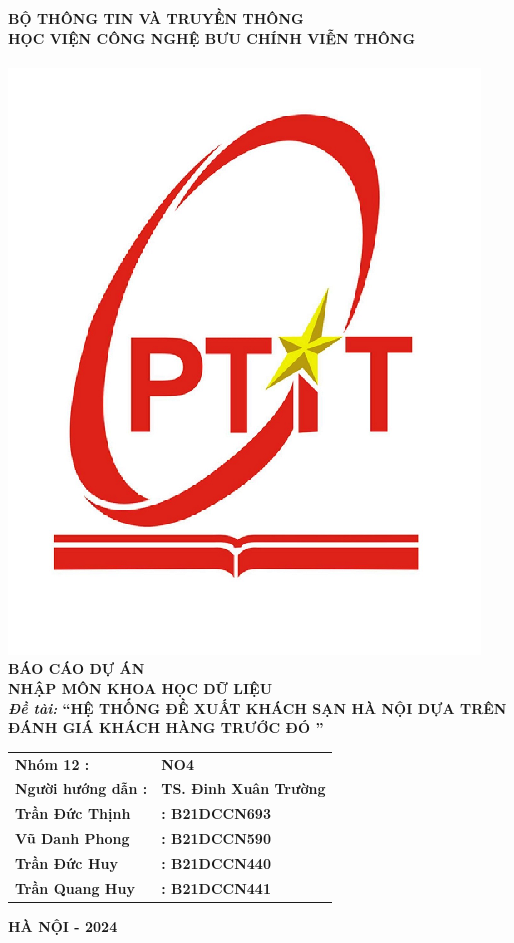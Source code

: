 \begin{center}
\hspace*{3cm} {\textbf{\large{BỘ THÔNG TIN VÀ TRUYỀN THÔNG}}}\\
\vspace{0.3cm}
\hspace*{3cm}  {\textbf{\large{HỌC VIỆN CÔNG NGHỆ BƯU CHÍNH VIỄN THÔNG}}}\\
\hspace*{3cm} {\textbf{\large{\underline{\hspace{6cm}}}}}\\
\vspace{0.7cm}
\hspace*{3cm} \includegraphics[width=0.3\linewidth]{ptit_logo_1.png}
\\
\vspace{0.7cm}
\hspace*{3cm}\linespread{1}\large\textbf{BÁO CÁO DỰ ÁN}\\
\hspace*{3cm}\linespread{1}\large\textbf {NHẬP MÔN KHOA HỌC DỮ LIỆU}
\vspace{1cm}
\\
\hspace*{2cm} \textbf{\textit{Đề tài:}  “HỆ THỐNG ĐỀ XUẤT KHÁCH SẠN HÀ NỘI DỰA TRÊN}
\\ \hspace*{2cm} \textbf{\hspace*{2cm} ĐÁNH GIÁ KHÁCH HÀNG TRƯỚC ĐÓ ” }

\vspace{1in}

\begin{tabular}{ll}
{\textbf{\large{Nhóm 12 :}}}  & {\textbf{\large{NO4}}} \\
{\textbf{\large{Người hướng dẫn : }}} & {\textbf{\large{TS. Đinh Xuân Trường}}} \\
{\textbf{\large{Trần Đức Thịnh}}} & {\textbf{\large{: B21DCCN693}}}  \\
{\textbf{\large{Vũ Danh Phong}}} & {\textbf{\large{: B21DCCN590}}}  \\
{\textbf{\large{Trần Đức Huy}}} & {\textbf{\large{: B21DCCN440}}}  \\
{\textbf{\large{Trần Quang Huy}}} & {\textbf{\large{: B21DCCN441}}}  \\


\end{tabular}


\vspace{1in}

\hspace*{3cm} \textbf{HÀ NỘI - 2024}
\end{center}
